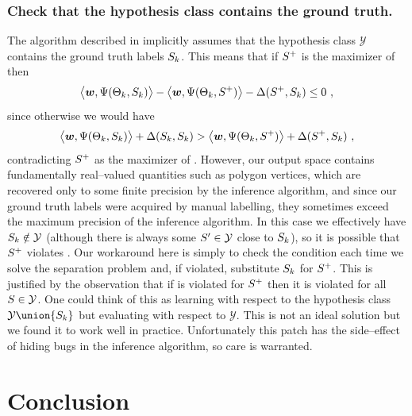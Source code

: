 \subsubsection{Check that the hypothesis class contains the ground
  truth.}

The algorithm described in \cite{Tsochantaridis04} implicitly assumes
that the hypothesis class $\mathcal{Y}$ contains the ground truth
labels $S_k$. This means that if $S^+$ is the maximizer of
 then
\begin{equation}
  \bigl\langle\boldsymbol{w}, \Psi(\Theta_k,S_k)\bigr\rangle
  - \bigl\langle\boldsymbol{w}, \Psi(\Theta_k,S^+)\bigr\rangle
  - \Delta(S^+,S_k) 
  \leq 
  0 ~,
  \label{eq:positive-slacks}
\end{equation}
since otherwise we would have
\begin{equation}
  \bigl\langle\boldsymbol{w}, \Psi(\Theta_k,S_k)\bigr\rangle
  + \Delta(S_k,S_k) 
  >
  \bigl\langle\boldsymbol{w}, \Psi(\Theta_k,S^+)\bigr\rangle
  + \Delta(S^+,S_k) ~,
\end{equation}
contradicting $S^+$ as the maximizer of
. However, our output space contains
fundamentally real--valued quantities such as polygon vertices, which
are recovered only to some finite precision by the inference
algorithm, and since our ground truth labels were acquired by manual
labelling, they sometimes exceed the maximum precision of the
inference algorithm. In this case we effectively have $S_k \notin
\mathcal{Y}$ (although there is always some $S' \in \mathcal{Y}$
close to $S_k$), so it is possible that $S^+$ violates
. Our workaround here is simply to check the
condition  each time we solve the separation
problem and, if violated, substitute $S_k$ for $S^+$. This is
justified by the observation that if  is
violated for $S^+$ then it is violated for all
$S\in\mathcal{Y}$. One could think of this as learning with
respect to the hypothesis class $\mathcal{Y} \union \{\Seam_k\}$ but
evaluating with respect to $\mathcal{Y}$. This is not an ideal
solution but we found it to work well in practice. Unfortunately this
patch has the side--effect of hiding bugs in the inference algorithm,
so care is warranted.

\section{Conclusion}
\label{sec:conclusion}

